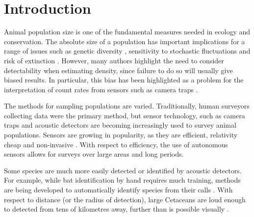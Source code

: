 \documentclass[a4paper,10pt,reqno,oneside]{amsart}
\begin{document}
\section{Introduction}

Animal population size is one of the fundamental measures needed in ecology and conservation. The absolute size of a population has important implications for a range of issues such as genetic diversity \citep{o1985genetic, fischer2000genetic, willi2005threefold}, sensitivity to stochastic fluctuations \citep{wright1983stochastic, richter1972extinction} and risk of extinction \citep{purvis2000predicting}. However, many authors highlight the need to consider detectability when estimating density, since failure to do so will usually give biased results. In particular, this bias has been highlighted as a problem for the interpretation of count rates from sensors such as camera traps \citep{jennelle2002use, foster2012critique}.

The methods for sampling populations are varied. Traditionally, human surveyors collecting data were the primary method, but sensor technology, such as camera traps \citep{ahumada2011community, rowcliffe2008surveys} and acoustic detectors \citep{ofarrel1999comparison, jones2011indicator, mellinger2007fixed} are becoming increasingly used to survey animal populations.  Sensors are growing in popularity, as they are efficient, relativity cheap and non-invasive \citep{gese2001monitoring, o2003crouching, silveira2003camera}. With respect to efficiency, the use of autonomous sensors allows for surveys over large areas and long periods. 

Some species are much more easily detected or identified by acoustic detectors. For example, while bat identification by hand requires much training, methods are being developed to automatically identify species from their calls \citep{walters_2012, Adams_2010}. With respect to distance (or the radius of detection), large Cetaceans are loud enough to detected from tens of kilometres away, further than is possible visually \cite{clark1995application, barlow2005estimates, mcdonald2004difar}.  
\end{document}
